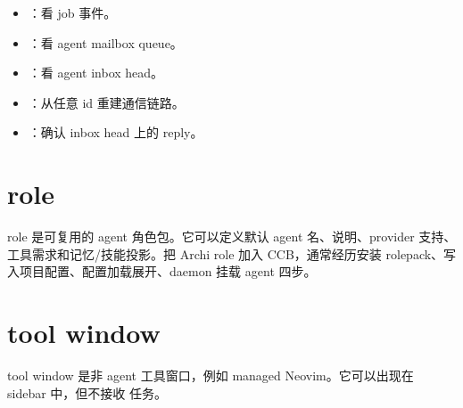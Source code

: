 \begin{itemize}
  \item {}：看 job 事件。
  \item {}：看 agent mailbox queue。
  \item {}：看 agent inbox head。
  \item {}：从任意 id 重建通信链路。
  \item {}：确认 inbox head 上的 reply。
\end{itemize}

\section{role}

role 是可复用的 agent 角色包。它可以定义默认 agent 名、说明、provider 支持、工具需求和记忆/技能投影。把 Archi role 加入 CCB，通常经历安装 rolepack、写入项目配置、配置加载展开、daemon 挂载 agent 四步。

\section{tool window}

tool window 是非 agent 工具窗口，例如 managed Neovim。它可以出现在 sidebar 中，但不接收  任务。
